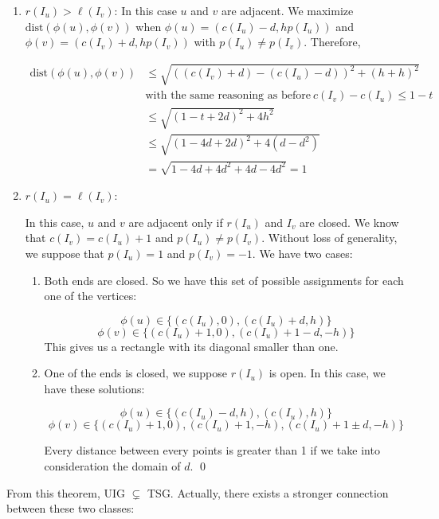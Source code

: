 {\begin{enumerate}
    $$\text{dist}(\phi(u),\phi(v)) \geq s + 1 - 2d > 1$$

  \item $r(I_u) > \ell(I_v)$:
    In this case $u$ and $v$ are adjacent. We maximize $\text{dist}(\phi(u),\phi(v))$ when $\phi(u) = (c(I_u)-d,hp(I_u))$ and $\phi(v) = (c(I_v)+d,hp(I_v))$ with $p(I_u) \neq p(I_v)$. Therefore,

\[    \begin{split}
    \text{dist}(\phi(u),\phi(v)) & \leq \sqrt{((c(I_v)+d)-(c(I_u)-d))^2 + (h+h)^2} \\
     & \text{with the same reasoning as before}\  c(I_v)-c(I_u) \leq 1-t\\
     & \leq \sqrt{(1-t+2d)^2 + 4h^2} \\
     & \leq \sqrt{(1-4d+2d)^2 + 4(d-d^2)} \\
     & = \sqrt{1-4d+4d^2 + 4d-4d^2} = 1
    \end{split}
\]

  \item $r(I_u) = \ell(I_v)$:

  In this case, $u$ and $v$ are adjacent only if $r(I_u)$ and $I_v$ are closed. We know that $c(I_v) = c(I_u)+1$ and $p(I_u) \neq p(I_v)$. Without loss of generality, we suppose that $p(I_u) = 1$ and $p(I_v) = -1$. We have two cases:
  \begin{enumerate}
    \item Both ends are closed. So we have this set of possible assignments for each one of the vertices:

    $$\phi(u) \in \{(c(I_u),0), (c(I_u)+d,h)\}$$
    $$\phi(v) \in \{(c(I_u)+1,0), (c(I_u)+1-d,-h)\}$$
    This gives us a rectangle with its diagonal smaller than one.

\item One of the ends is closed, we suppose $r(I_u)$ is open. In this case, we have these solutions:

  $$\phi(u) \in \{(c(I_u)-d,h), (c(I_u),h)\}$$
  $$\phi(v) \in \{(c(I_u)+1,0), (c(I_u)+1,-h), (c(I_u)+1\pm d,-h)\}$$

  Every distance between every points is greater than 1 if we take into consideration the domain of $d$. \qed

  \end{enumerate}
\end{enumerate}
}

From this theorem, UIG $\subsetneq$ TSG. Actually, there exists a stronger connection between these two classes:

